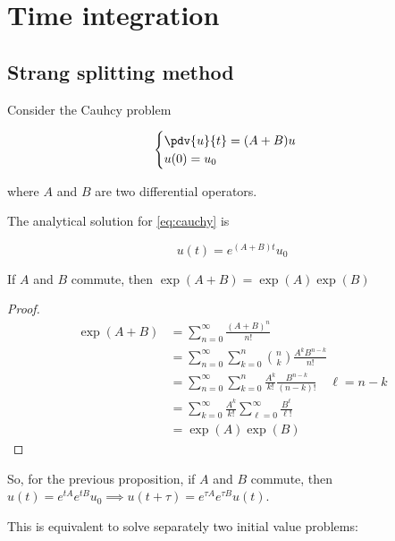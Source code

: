 \section{Time integration}

\subsection{Strang splitting method}

Consider the Cauhcy problem

\begin{equation}
    \begin{cases}
        \pdv{u}{t} = (A + B) u \\
        u(0) = u_0
    \end{cases}
    \label{eq:cauchy}
\end{equation}

where $A$ and $B$ are two differential operators.

The analytical solution for \ref{eq:cauchy} is

\[ u(t) = e^{(A + B)t} u_0 \]

\begin{proposition}
    If $A$ and $B$ commute, then $\exp(A+B) = \exp(A)\exp(B)$
\end{proposition}

\begin{proof}
    
    \begin{align*}
        \exp(A + B) &= \sum_{n = 0}^\infty \frac{(A + B)^n}{n!} \\
                    &= \sum_{n = 0}^\infty \sum_{k = 0}^n \binom{n}{k} \frac{A^k B^{n-k}}{n!} \\
                    &= \sum_{n = 0}^\infty \sum_{k = 0}^n \frac{A^k}{k!} \frac{B^{n - k}}{(n - k)!}  \quad \ell = n - k \\
                    &= \sum_{k = 0}^\infty \frac{A^k}{k!} \sum_{\ell = 0}^\infty \frac{B^\ell}{\ell!} \\
                    &= \exp(A)\exp(B)
    \end{align*}

\end{proof}

So, for the previous proposition, if $A$ and $B$ commute, then $u(t) = e^{tA}e^{tB}u_0 \implies u(t + \tau) = e^{\tau A}e^{\tau B}u(t)$.

This is equivalent to solve separately two initial value problems:

